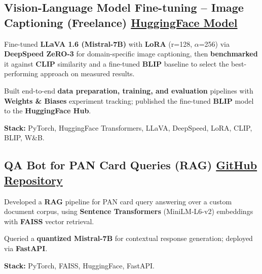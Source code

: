 \documentclass[letter,10pt]{article}
\begin{document}
\subsection{Vision-Language Model Fine-tuning – Image Captioning (Freelance) \hfill \href{https://huggingface.co/sunil448832/blip-model}{HuggingFace Model}}
\begin{zitemize}
\item Fine-tuned \textbf{LLaVA 1.6 (Mistral-7B)} with \textbf{LoRA} (r=128, $\alpha$=256) via \textbf{DeepSpeed ZeRO-3} for domain-specific image captioning, then \textbf{benchmarked} it against \textbf{CLIP} similarity and a fine-tuned \textbf{BLIP} baseline to select the best-performing approach on measured results.
\item Built end-to-end \textbf{data preparation, training, and evaluation} pipelines with \textbf{Weights \& Biases} experiment tracking; published the fine-tuned \textbf{BLIP} model to the \textbf{HuggingFace Hub}.
\item \textbf{Stack:} PyTorch, HuggingFace Transformers, LLaVA, DeepSpeed, LoRA, CLIP, BLIP, W\&B.
\end{zitemize}

\subsection{QA Bot for PAN Card Queries (RAG) \hfill \href{https://github.com/sunil448832/Natural-Language-Processing/tree/master/RAG(Retrieval\%20Augment\%20Generation)}{GitHub Repository}}
\begin{zitemize}
\item Developed a \textbf{RAG} pipeline for PAN card query answering over a custom document corpus, using \textbf{Sentence Transformers} (MiniLM-L6-v2) embeddings with \textbf{FAISS} vector retrieval.
\item Queried a \textbf{quantized Mistral-7B} for contextual response generation; deployed via \textbf{FastAPI}.
\item \textbf{Stack:} PyTorch, FAISS, HuggingFace, FastAPI.
\end{zitemize}
\end{document}
